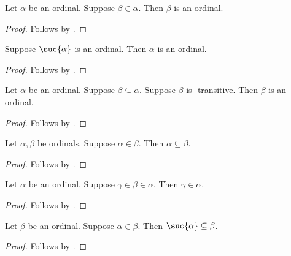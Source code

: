 \begin{classification}\label{elem_of_ordinal_is_ordinal}
    Let $\alpha$ be an ordinal.
    Suppose $\beta\in\alpha$.
    Then $\beta$ is an ordinal.
\end{classification}
\begin{proof}
    Follows by .
\end{proof}

\begin{proposition}\label{suc_ordinal_implies_ordinal}
    Suppose $\suc{\alpha}$ is an ordinal.
    Then $\alpha$ is an ordinal.
\end{proposition}
\begin{proof}
    Follows by .
\end{proof}

\begin{proposition}\label{transitivesubseteq_of_ordinal_is_ordinal}
    Let $\alpha$ be an ordinal.
    Suppose $\beta\subseteq\alpha$.
    Suppose $\beta$ is \in-transitive.
    Then $\beta$ is an ordinal.
\end{proposition}
\begin{proof}
    Follows by .
\end{proof}

\begin{proposition}\label{ordinal_elem_implies_subseteq}
    Let $\alpha,\beta$ be ordinals.
    Suppose $\alpha\in\beta$.
    Then $\alpha\subseteq\beta$.
\end{proposition}
\begin{proof}
    Follows by .
\end{proof}

\begin{proposition}\label{ordinal_transitivity}
    Let $\alpha$ be an ordinal.
    Suppose $\gamma\in\beta\in\alpha$.
    Then $\gamma\in\alpha$.
\end{proposition}
\begin{proof}
    Follows by .
\end{proof}

\begin{proposition}\label{ordinal_suc_subseteq}
    Let $\beta$ be an ordinal.
    Suppose $\alpha\in\beta$.
    Then $\suc{\alpha}\subseteq\beta$.
\end{proposition}
\begin{proof}
    Follows by .
\end{proof}


